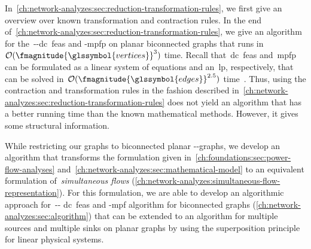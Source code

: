 In~\cref{ch:network-analyzes:sec:reduction-transformation-rules}, we first give
an overview over known transformation and contraction rules. In the end
of~\cref{ch:network-analyzes:sec:reduction-transformation-rules}, we give an
algorithm for the~\source-\sink-\gls{dc}~\gls{feas} and -\gls{mpfp} on planar
biconnected graphs that runs in~$\bigO(\fmagnitude{\glssymbol{vertices}}^3)$
time. Recall that~\gls{dc}~\gls{feas} and~\gls{mpfp} can be formulated as a
linear system of equations and an~\gls{lp}, respectively, that can be solved 
in~$\bigO(\fmagnitude{\glssymbol{edges}}^{2.5})$ time~\parencite{Vai89,Bar75}.
% 
Thus, using the contraction and transformation rules in the fashion described
in~\cref{ch:network-analyzes:sec:reduction-transformation-rules} does not yield
an algorithm that has a better running time than the known mathematical methods.
However, it gives some structural information.

While restricting our graphs to biconnected planar \source-\sink-graphs, we
develop an algorithm that transforms the formulation given
in~\cref{ch:foundations:sec:power-flow-analyses}
and~\cref{ch:network-analyzes:sec:mathematical-model} to an equivalent
formulation of~\emph{simultaneous flows}
(\cref{ch:network-analyzes:simultaneous-flow-representation}). For this
formulation, we are able to develop an algorithmic approach for~\source-\sink-
\gls{dc}~\gls{feas} and -\gls{mpf} algorithm for biconnected graphs
(\cref{ch:network-analyzes:sec:algorithm}) that can be extended to an algorithm
for multiple sources and multiple sinks on planar graphs by using the
superposition principle for linear physical systems.
% 
% 
